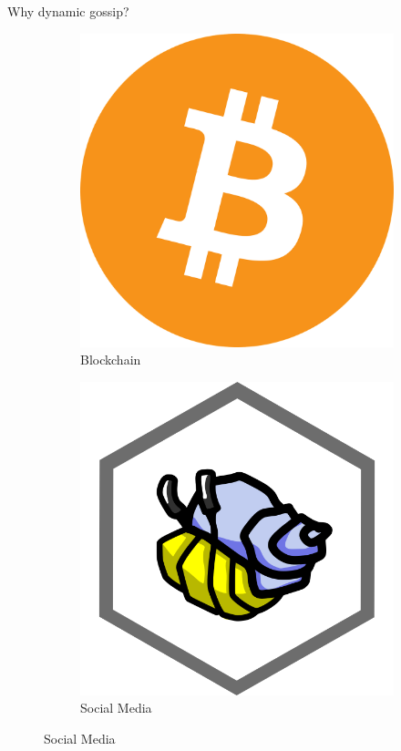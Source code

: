 \documentclass[aspectratio=169]{beamer}
\begin{document}
\begin{frame}[c]{Why dynamic gossip?}
    \begin{figure}
      \begin{subfigure}[t]{.3\paperwidth}
        \centering
        \includegraphics[height=.3\paperheight]{bitcoin.png}
        \caption*{Blockchain \cite{baird_swirlds_2016,van_renesse_blockchain_2016}}
      \end{subfigure}
      \qquad
      \begin{subfigure}[t]{.3\paperwidth}
        \centering
        \includegraphics[height=.3\paperheight]{ssbc.png}
        \caption*{Social Media \cite{tarr_secure_2019}}
      \end{subfigure}


\end{figure}
\end{frame}
\end{document}
